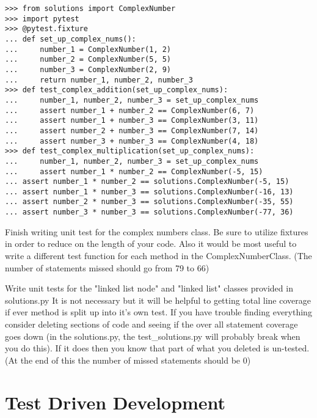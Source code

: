 \documentclass[nociteref]{../../SIAM-GH-book}
\begin{document}
\begin{lstlisting}
>>> from solutions import ComplexNumber
>>> import pytest
>>> @pytest.fixture
... def set_up_complex_nums():
...     number_1 = ComplexNumber(1, 2)
...     number_2 = ComplexNumber(5, 5)
...     number_3 = ComplexNumber(2, 9)
...     return number_1, number_2, number_3
>>> def test_complex_addition(set_up_complex_nums):
...     number_1, number_2, number_3 = set_up_complex_nums
...     assert number_1 + number_2 == ComplexNumber(6, 7)
...     assert number_1 + number_3 == ComplexNumber(3, 11)
...     assert number_2 + number_3 == ComplexNumber(7, 14)
...     assert number_3 + number_3 == ComplexNumber(4, 18)
>>> def test_complex_multiplication(set_up_complex_nums):
...     number_1, number_2, number_3 = set_up_complex_nums
...     assert number_1 * number_2 == ComplexNumber(-5, 15)
...	assert number_1 * number_2 == solutions.ComplexNumber(-5, 15)
...	assert number_1 * number_3 == solutions.ComplexNumber(-16, 13)
...	assert number_2 * number_3 == solutions.ComplexNumber(-35, 55)
...	assert number_3 * number_3 == solutions.ComplexNumber(-77, 36)

\end{lstlisting}

\begin{problem}
Finish writing unit test for the complex numbers class. Be sure to utilize fixtures in order to reduce on the length of your code.
Also it would be most useful to write a different test function for each method in the ComplexNumberClass.
(The number of statements missed should go from 79 to 66)
\end{problem}

\begin{problem}
Write unit tests for the "linked list node" and "linked list" classes provided in solutions.py It is not necessary but it will be helpful to getting total line coverage if ever method is split up into it's own test.
If you have trouble finding everything consider deleting sections of code and seeing if the over all statement coverage goes down (in the solutions.py, the test\_solutions.py will probably break when you do this).
If it does then you know that part of what you deleted is un-tested.
(At the end of this the number of missed statements should be 0)
\end{problem}

\section*{Test Driven Development}
\end{document}
